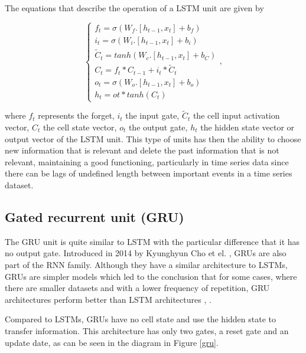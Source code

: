 The equations that describe the operation of a \ac{LSTM} unit are given by 

\begin{equation}
    \begin{cases} 
        
        f_t=\sigma(W_f.[h_{t-1},x_t] + b_f)\\
        i_t=\sigma(W_i.[h_{t-1},x_t] + b_i)\\
        \widetilde{C}_t = tanh(W_c.[h_{t-1},x_t] + b_C)\\
        C_t=f_t*C_{t-1}+i_t* \widetilde{C}_t\\
        o_t=\sigma(W_o.[h_{t-1},x_t] + b_o)\\
        h_t=ot*tanh(C_t)
        
         
    \end{cases} ,
\end{equation}

where $f_t$ represents the forget, $i_t$ the input gate, $\widetilde{C}_t$ the cell input activation vector, ${C}_t$ the cell state vector, $o_t$ the output gate, $h_t$ the hidden state vector or output vector of the \ac{LSTM} unit. This type of units has then the ability to choose new information that is relevant and delete the past information that is not relevant, maintaining a good functioning, particularly in time series data since there can be lags of undefined length between important events in a time series dataset.




\subsection{Gated recurrent unit (GRU)}

The \ac{GRU} unit is quite similar to \ac{LSTM} with the particular difference that it has no output gate. Introduced in 2014 by Kyunghyun Cho et el. \cite{gru0}, \ac{GRU}s are also part of the \ac{RNN} family. Although they have a similar architecture to \ac{LSTM}s, \ac{GRU}s are simpler models which led to the conclusion that for some cases, where there are smaller datasets and with a lower frequency of repetition, \ac{GRU} architectures perform better than \ac{LSTM} architectures \cite{gru1}, \cite{gru2}.

Compared to \ac{LSTM}s, \ac{GRU}s have no cell state and use the hidden state to transfer information. This architecture has only two gates, a reset gate and an update date, as can be seen in the diagram in Figure \ref{gru}.

